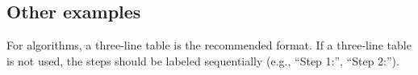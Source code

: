 \documentclass{jcd}
\theoremstyle{plain}
\theoremstyle{definition}
\begin{document}
\subsection{Other examples}

For algorithms, a three-line table is the recommended format. If a three-line table is not used, the steps should be labeled sequentially (e.g., “Step 1:”, “Step 2:”).

\end{document}
